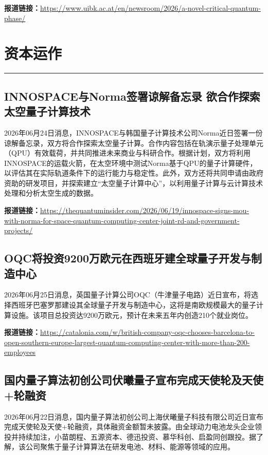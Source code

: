 \documentclass[12pt,a4paper]{ctexart}
\begin{document}
\noindent\textbf{报道链接：}\url{https://www.uibk.ac.at/en/newsroom/2026/a-novel-critical-quantum-phase/}


\newpage
\section{资本运作}
\vspace{-0.5em}
\noindent\rule{\linewidth}{1.5pt}

\subsection{ INNOSPACE与Norma签署谅解备忘录 欲合作探索太空量子计算技术 }

2026年06月24日消息，INNOSPACE与韩国量子计算技术公司Norma近日签署一份谅解备忘录，双方将合作探索太空量子计算。合作内容包括在轨演示量子处理单元（QPU）有效载荷，并共同推进未来商业与科研合作。根据计划，双方将利用INNOSPACE的运载火箭，在太空环境中测试Norma基于QPU的量子计算硬件，以评估其在实际轨道条件下的运行能力与稳定性。此外，双方还将共同申请由政府资助的研发项目，并探索建立“太空量子计算中心”，以利用量子计算与云计算技术处理和分析太空生成的数据。

\noindent\textbf{报道链接：}\url{https://thequantuminsider.com/2026/06/19/innospace-signs-mou-with-norma-for-space-quantum-computing-center-joint-rd-and-government-projects/}

\subsection{ OQC将投资9200万欧元在西班牙建全球量子开发与制造中心 }

2026年06月25日消息，英国量子计算公司OQC（牛津量子电路）近日宣布，将选择西班牙巴塞罗那建设其全球量子开发与制造中心，这将是南欧规模最大的量子计算设施。该项目总投资达9200万欧元，预计在未来五年内创造210个就业岗位。

\noindent\textbf{报道链接：}\url{https://catalonia.com/w/british-company-oqc-chooses-barcelona-to-open-southern-europe-largest-quantum-computing-center-with-more-than-200-employees}

\subsection{ 国内量子算法初创公司伏曦量子宣布完成天使轮及天使+轮融资 }

2026年06月22日消息，国内量子算法初创公司上海伏曦量子科技有限公司近日宣布完成天使轮及天使+轮融资，具体融资金额暂未披露。由全球动力电池龙头企业领投并持续加注，小苗朗程、五源资本、德迅投资、慕华科创、启盈同创跟投。据了解，该公司聚焦于量子计算算法在研发电池、材料、能源等领域的应用。
\end{document}
